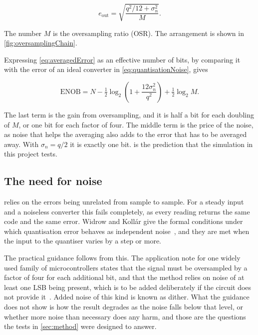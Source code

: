 \begin{equation}
  \label{eq:averagedError}
  e_{\mathrm{out}} = \sqrt{\frac{q^2/12 + \sigma_n^2}{M}}.
\end{equation}

The number $M$ is the oversampling ratio (OSR). The arrangement is shown in
\cref{fig:oversamplingChain}.



Expressing \cref{eq:averagedError} as an effective number of bits, by
comparing it with the error of an ideal converter in
\cref{eq:quantisationNoise}, gives

\begin{equation}
  \label{eq:enobTheory}
  \mathrm{ENOB} = N - \tfrac{1}{2}\log_2\!\left(1 + \frac{12\sigma_n^2}{q^2}\right)
                  + \tfrac{1}{2}\log_2 M.
\end{equation}

The last term is the gain from oversampling, and it is half a bit for each
doubling of $M$, or one bit for each factor of four. The middle term is the
price of the noise, as noise that helps the averaging also adds to the error
that has to be averaged away. With $\sigma_n = q/2$ it is exactly one bit.
 is the prediction that the simulation in this project
tests.

\subsection{The need for noise}

 relies on the errors being unrelated from sample to
sample. For a steady input and a noiseless converter this fails completely,
as every reading returns the same code and the same error. Widrow and
Koll\'ar give the formal conditions under which quantisation error behaves as
independent noise~\cite{widrow_kollar_2008}, and they are met when the input
to the quantiser varies by a step or more.

The practical guidance follows from this. The application note for one widely
used family of microcontrollers states that the signal must be oversampled by
a factor of four for each additional bit, and that the method relies on noise
of at least one LSB being present, which is to be added deliberately if the
circuit does not provide it~\cite{atmel_avr121_2005}. Added noise of this
kind is known as dither. What the guidance does not show is how the result
degrades as the noise falls below that level, or whether more noise than
necessary does any harm, and those are the questions the tests in
\cref{sec:method} were designed to answer.
